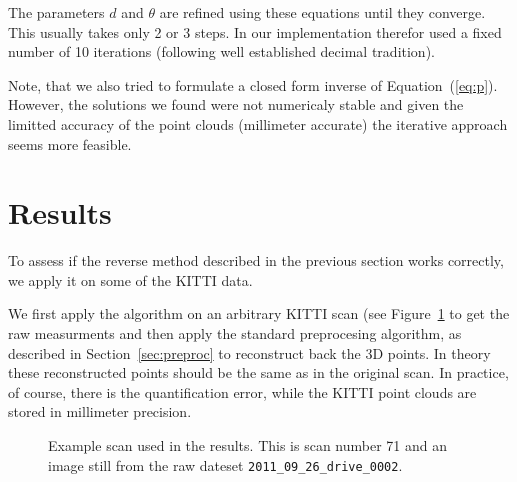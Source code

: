 \documentclass[english]{article}
\begin{document}

The parameters $d$ and $\theta$ are refined using these equations until they
converge. This usually takes only 2 or 3 steps. In our implementation therefor
used a fixed number of 10 iterations (following well established decimal
tradition).

Note, that we also tried to formulate a closed form inverse of
Equation~(\ref{eq:p}). However, the solutions we found were not numericaly
stable and given the limitted accuracy of the point clouds (millimeter accurate)
the iterative approach seems more feasible.

\section{Results}
To assess if the reverse method described in the previous section works
correctly, we apply it on some of the KITTI data.

We first apply the algorithm on an arbitrary KITTI scan (see Figure~\ref{fig:example} to get the raw measurments and then
apply the standard preprocesing algorithm, as described in
Section~\ref{sec:preproc} to reconstruct back the 3D points. In theory these
reconstructed points should be the same as in the original scan. In practice, of
course, there is the quantification error, while the KITTI point clouds are
stored in millimeter precision.

\begin{figure}
  \begin{center}
      \caption{Example scan used in the results. This is scan number 71 and an
      image still from the raw dateset \texttt{2011\_09\_26\_drive\_0002}.}
  \label{fig:example}
  \end{center}
\end{figure}
\end{document}
